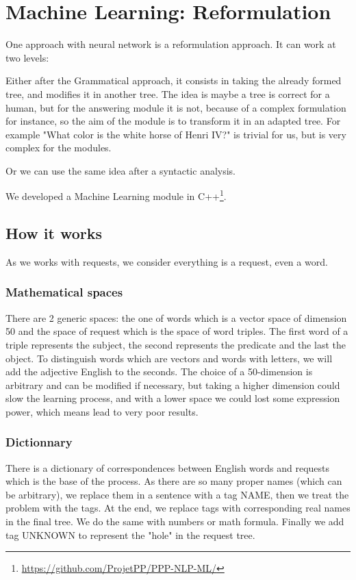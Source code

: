\section{Machine Learning: Reformulation}

One approach with neural network is a reformulation approach. It can work at two levels: 

Either after the Grammatical approach, it consists in taking the already formed tree, and modifies it in another tree. The idea is maybe a tree is correct for a human, but for the answering module it is not, because of a complex formulation for instance, so the aim of the module is to transform it in an adapted tree. For example "What color is the white horse of Henri IV?" is trivial for us, but is very complex for the modules.

Or we can use the same idea after a syntactic analysis.

We developed a Machine Learning module in C++\footnote{\url{https://github.com/ProjetPP/PPP-NLP-ML/}}.

\subsection{How it works}

As we works with requests, we consider everything is a request, even a word.

\subsubsection{Mathematical spaces}

There are 2 generic spaces: the one of words which is a vector space of dimension 50 and the space of request which is the space of word triples. The first word of a triple represents the subject, the second represents the predicate and the last the object.
To distinguish words which are vectors and words with letters, we will add the adjective English to the seconds.
The choice of a 50-dimension is arbitrary and can be modified if necessary, but taking a higher dimension could slow the learning process, and with a lower space we could lost some expression power, which means lead to very poor results.

\subsubsection{Dictionnary}

There is a dictionary of correspondences between English words and requests which is the base of the process. As there are so many proper names (which can be arbitrary), we replace them in a sentence with a tag NAME, then we treat the problem with the tags. At the end, we replace tags with corresponding real names in the final tree. We do the same with numbers or math formula. Finally we add tag UNKNOWN to represent the "hole" in the request tree.

